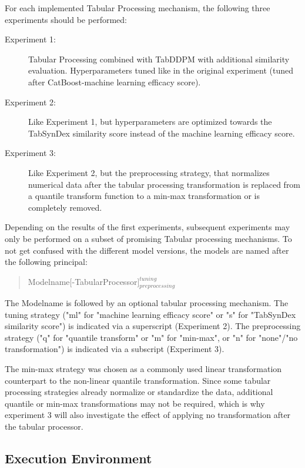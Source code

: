\noindent For each implemented Tabular Processing mechanism, the following three experiments should be performed:

\begin{description}
	\item[Experiment 1:] Tabular Processing combined with TabDDPM with additional similarity evaluation. Hyperparameters tuned like in the original experiment (tuned after CatBoost-machine learning efficacy score).
	\item[Experiment 2:] Like Experiment 1, but hyperparameters are optimized towards the TabSynDex similarity score instead of the machine learning efficacy score.
	\item[Experiment 3:] Like Experiment 2, but the preprocessing strategy, that normalizes numerical data after the tabular processing transformation is replaced from a quantile transform function to a min-max transformation or is completely removed.
\end{description}

\noindent Depending on the results of the first experiments, subsequent experiments may only be performed on a subset of promising Tabular processing mechanisms.
To not get confused with the different \gls{model} versions, the models are named after the following principal:
\begin{quote}
Modelname[-TabularProcessor]$^{tuning}_{preprocessing}$
\end{quote}
The Modelname is followed by an optional tabular processing mechanism.
The tuning strategy ("ml" for "machine learning efficacy score" or "s" for "TabSynDex similarity score") is indicated via a superscript (Experiment 2).
The preprocessing strategy ("q" for "quantile transform" or "m" for "min-max", or "n" for "none"/"no transformation") is indicated via a subscript (Experiment 3).

The min-max strategy was chosen as a commonly used linear transformation counterpart to the non-linear quantile transformation.
Since some tabular processing strategies already normalize or standardize the data, additional quantile or min-max transformations may not be required, 
which is why experiment 3 will also investigate the effect of applying no transformation after the tabular processor.

\subsection{Execution Environment}
\label{ch:environment}

